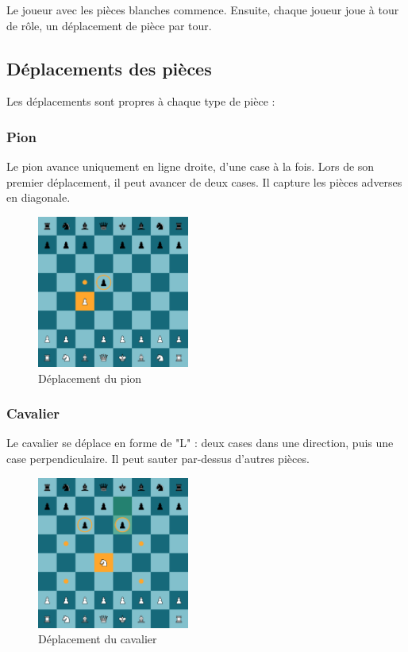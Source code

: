 \documentclass{article}
\begin{document}
Le joueur avec les pièces blanches commence. Ensuite, chaque joueur joue à tour de rôle, un déplacement de pièce par tour.

\subsection{Déplacements des pièces}

Les déplacements sont propres à chaque type de pièce :

\subsubsection*{Pion}
Le pion avance uniquement en ligne droite, d'une case à la fois. Lors de son premier déplacement, il peut avancer de deux cases. Il capture les pièces adverses en diagonale.

\begin{figure}[h]
    \centering
    \includegraphics[width=\textwidth,height=5.0cm,keepaspectratio]{pionMove.png}
    \caption{Déplacement du pion}
\end{figure}

\subsubsection*{Cavalier}
Le cavalier se déplace en forme de "L" : deux cases dans une direction, puis une case perpendiculaire. Il peut sauter par-dessus d'autres pièces.

\begin{figure}[h]
    \centering
    \includegraphics[width=\textwidth,height=5.0cm,keepaspectratio]{cavalierMove.png}
    \caption{Déplacement du cavalier}
\end{figure}
\end{document}

